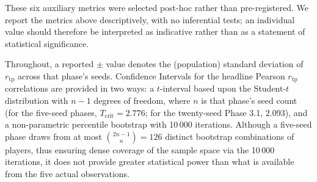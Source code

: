 \documentclass[10pt,twocolumn,letterpaper]{article}
\newcommand{\rtp}{\ensuremath{r_{\mathrm{tp}}}}
\begin{document}
These six auxiliary metrics were selected post-hoc rather than
pre-registered. We report the metrics above descriptively, with no inferential
tests; an individual value should therefore be interpreted as
indicative rather than as a statement of statistical significance.

Throughout, a reported $\pm$ value denotes the (population) standard deviation of $\rtp$ across that phase's seeds. Confidence Intervals for the headline Pearson $\rtp$ correlations are provided in two ways: a $t$-interval based upon the Student-$t$ distribution with $n-1$ degrees of freedom, where $n$ is that phase's seed count (for the five-seed phases, $T_{\text{crit}} = 2.776$; for the twenty-seed Phase 3.1, $2.093$), and a non-parametric percentile bootstrap with 10\,000 iterations. Although a five-seed phase draws from at most $\binom{2n-1}{n} = 126$ distinct bootstrap combinations of players,
thus ensuring dense coverage of the sample space via the 10\,000
iterations, it does not provide greater statistical power than what
is available from the five actual observations.
\end{document}
